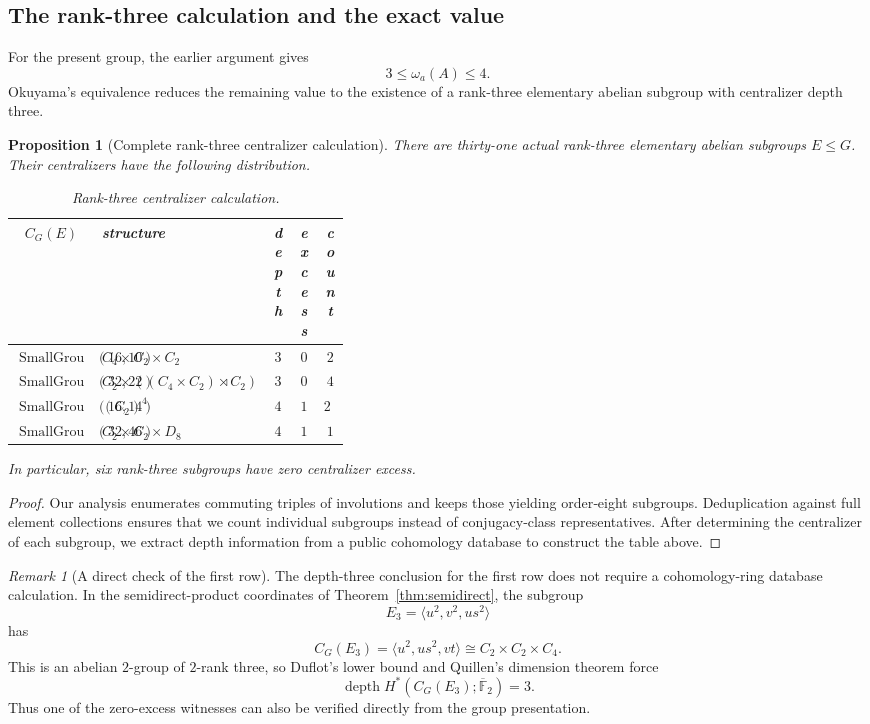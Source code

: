 \documentclass[11pt]{amsart}
\newtheorem{proposition}[theorem]{Proposition}
\theoremstyle{definition}
\theoremstyle{remark}
\newtheorem{remark}[theorem]{Remark}
\DeclareMathOperator{\depth}{depth}
\newcommand{\kbar}{\overline{\mathbb F}_{2}}
\newcommand{\SG}[2]{\operatorname{SmallGroup}(#1,#2)}
\begin{document}
\subsection{The rank-three calculation and the exact value}

For the present group, the earlier argument gives
\[
3\leq\omega_a(A)\leq4.
\]
Okuyama's equivalence reduces the remaining value to the existence of a rank-three elementary abelian subgroup with centralizer depth three.

\begin{proposition}[Complete rank-three centralizer calculation]
\label{prop:rank-three-calculation}
There are thirty-one actual rank-three elementary abelian subgroups $E\leq G$.  Their centralizers have the following distribution.

\begin{table}[ht]
\centering
\caption{Rank-three centralizer calculation.}
\label{tab:rank-three-centralizers}
\scriptsize
\renewcommand{\arraystretch}{1.15}
\begin{tabular}{@{}c>{\raggedright\arraybackslash}p{0.39\linewidth}ccc@{}}
\toprule
$C_G(E)$ & structure & depth & excess & count \\
\midrule
$\SG{16}{10}$ & $C_4\times C_2\times C_2$ & $3$ & $0$ & $2$ \\
$\SG{32}{22}$ & $C_2\times((C_4\times C_2)\rtimes C_2)$ & $3$ & $0$ & $4$ \\
$\SG{16}{14}$ & $(C_2)^4$ & $4$ & $1$ & $24$ \\
$\SG{32}{46}$ & $C_2\times C_2\times D_8$ & $4$ & $1$ & $1$ \\
\bottomrule
\end{tabular}
\end{table}

In particular, six rank-three subgroups have zero centralizer excess.
\end{proposition}

\begin{proof}
Our analysis enumerates commuting triples of involutions and keeps those yielding order‑eight subgroups. Deduplication against full element collections ensures that we count individual subgroups instead of conjugacy‑class representatives. After determining the centralizer of each subgroup, we extract depth information from a public cohomology database to construct the table above.

\end{proof}

\begin{remark}[A direct check of the first row]
The depth-three conclusion for the first row does not require a cohomology-ring database calculation.  In the semidirect-product coordinates of Theorem~\ref{thm:semidirect}, the subgroup
\[
E_3=\langle u^2,v^2,us^2\rangle
\]
has
\[
C_G(E_3)=\langle u^2,us^2,vt\rangle
\cong C_2\times C_2\times C_4.
\]
This is an abelian $2$-group of $2$-rank three, so Duflot's lower bound and Quillen's dimension theorem force
\[
\depth H^*(C_G(E_3);\kbar)=3.
\]
Thus one of the zero-excess witnesses can also be verified directly from the group presentation.
\end{remark}
\end{document}
